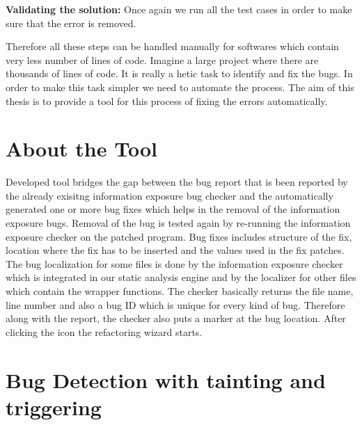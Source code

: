 \textbf{Validating the solution:} Once again we run all the
test cases in order to make sure that the error is removed.



Therefore all these steps can be handled manually for softwares
which contain very less number of lines of code. Imagine
a large project where there are thousands of lines of code.
It is really a hetic task to identify and fix the bugs.
In order to make this task simpler we need to automate the
process. The aim of this thesis is to provide a tool for this
process of fixing the errors automatically.




\section{About the Tool}
Developed tool bridges the gap between the bug report 
that is been reported by the already exisitng information
exposure bug checker and the automatically generated one
or more bug fixes which helps in the removal of the information
exposure bugs. Removal of the bug is tested again by re-running
the information exposure checker on the patched program.
Bug fixes includes 
structure of the fix, location where the fix has 
to be inserted
and the values used in the fix patches. The bug localization
for some files is done
by the information exposure checker which is 
integrated in our static analysis engine and
by the localizer for other files which contain 
the wrapper functions. The checker basically returns the file name,
line number and also a bug ID which is unique for every kind of bug.
Therefore along with the report, the checker also puts a marker at the bug location.
After clicking the icon the refactoring wizard starts.


\section{Bug Detection with tainting and triggering}

